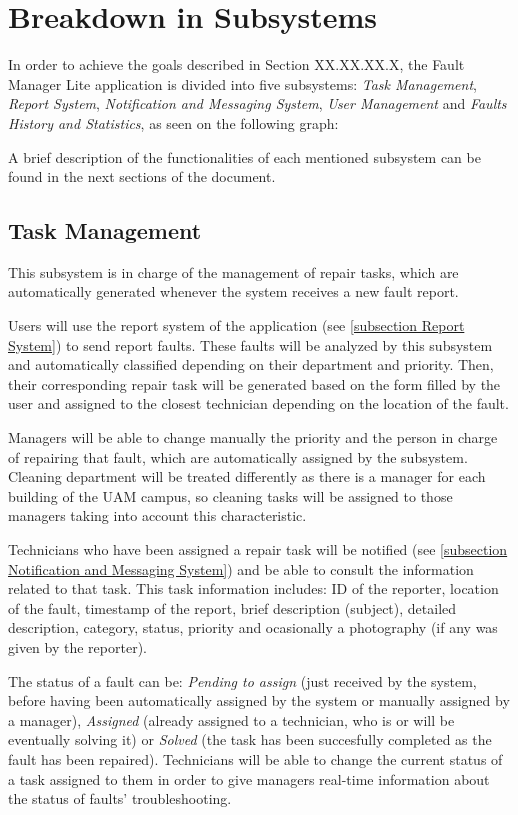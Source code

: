 \section{Breakdown in Subsystems}


In order to achieve the goals described in Section XX.XX.XX.X, the Fault Manager Lite application is divided into five subsystems: \emph{Task Management}, \emph{Report System}, \emph{Notification and Messaging System}, \emph{User Management} and \emph{Faults History and Statistics}, as seen on the following graph:


A brief description of the functionalities of each mentioned subsystem can be found in the next sections of the document.


\subsection{Task Management}
\label{subsection Task Management}

This subsystem is in charge of the management of repair tasks, which are automatically generated whenever the system receives a new fault report.

Users will use the report system of the application (see \ref{subsection Report System}) to send report faults. These faults will be analyzed by this subsystem and  automatically classified depending on their department and priority. Then, their corresponding repair task will be generated based on the form filled by the user and assigned to the closest technician depending on the location of the fault.

Managers will be able to change manually the priority and the person in charge of repairing that fault, which are automatically assigned by the subsystem. Cleaning department will be treated differently as there is a manager for each building of the UAM campus, so cleaning tasks will be assigned to those managers taking into account this characteristic.

Technicians who have been assigned a repair task will be notified (see \ref{subsection Notification and Messaging System}) and be able to consult the information related to that task. This task information includes: ID of the reporter, location of the fault, timestamp of the report, brief description (subject), detailed description, category, status, priority and ocasionally a photography (if any was given by the reporter). 

The status of a fault can be: \emph{Pending to assign} (just received by the system, before having been automatically assigned by the system or manually assigned by a manager), \emph{Assigned} (already assigned to a technician, who is or will be eventually solving it) or \emph{Solved} (the task has been succesfully completed as the fault has been repaired). Technicians will be able to change the current status of a task assigned to them in order to give managers real-time information about the status of faults' troubleshooting.

